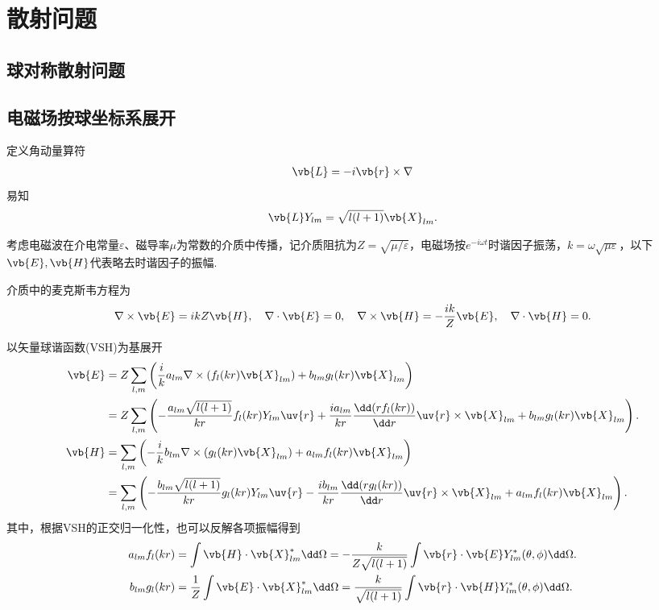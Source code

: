 \chapter{散射问题}
\section{球对称散射问题}
\section{电磁场按球坐标系展开}
\label{sec:em_field_spherical_expansion}

定义角动量算符
\begin{align*}
	\vb{L} = -i \vb{r} \times\nabla
\end{align*}
易知
\begin{align*}
	\vb{L} Y_{lm} = \sqrt{l(l+1)} \vb{X}_{lm}.
\end{align*}

考虑电磁波在介电常量\(\varepsilon\)、磁导率\(\mu\)为常数的介质中传播，记介质阻抗为\(Z = \sqrt{\mu/\varepsilon}\)，电磁场按\(e^{-i\omega t}\)时谐因子振荡，\(k = \omega\sqrt{\mu\varepsilon}\)，以下\(\vb{E},\vb{H}\)代表略去时谐因子的振幅.

介质中的麦克斯韦方程为
\begin{align*}
	\nabla \times \vb{E} = ikZ \vb{H},\quad \nabla \cdot \vb{E}=0,\quad \nabla \times \vb{H}=-\frac{ik}{Z}\vb{E},\quad \nabla \cdot \vb{H}=0.
\end{align*}

以矢量球谐函数(VSH)为基展开
\begin{equation*}
	\begin{aligned}
		\vb{E} & = Z\sum_{l,m}\left( \frac{i}{k}a_{lm}\nabla\times\left(f_l(kr)\vb{X}_{lm}\right) + b_{lm}g_l(kr)\vb{X}_{lm} \right)                                                             \\
		       & = Z\sum_{l,m}\left( -\frac{a_{lm}\sqrt{l(l+1)}}{kr}f_l(kr)Y_{lm}\uv{r} + \frac{ia_{lm}}{kr}\frac{\dd(rf_l(kr))}{\dd r}\uv{r}\times\vb{X}_{lm} + b_{lm}g_l(kr)\vb{X}_{lm} \right). \\
		\vb{H} & = \sum_{l,m}\left( -\frac{i}{k}b_{lm}\nabla\times\left(g_l(kr)\vb{X}_{lm}\right) + a_{lm}f_l(kr)\vb{X}_{lm} \right)                                                             \\
		       & = \sum_{l,m}\left( -\frac{b_{lm}\sqrt{l(l+1)}}{kr}g_l(kr)Y_{lm}\uv{r} - \frac{ib_{lm}}{kr}\frac{\dd(rg_l(kr))}{\dd r}\uv{r}\times\vb{X}_{lm} + a_{lm}f_l(kr)\vb{X}_{lm} \right).
	\end{aligned}
\end{equation*}
其中，根据VSH的正交归一化性，也可以反解各项振幅得到
\begin{align*}
	a_{lm}f_l(kr) &= \int\vb{H}\cdot\vb{X}_{lm}^*\dd \Omega = -\frac{k}{Z\sqrt{l(l+1)}}\int\vb{r}\cdot\vb{E}Y_{lm}^*(\theta,\phi)\dd \Omega.\\
	b_{lm}g_l(kr) &= \frac{1}{Z}\int\vb{E}\cdot\vb{X}_{lm}^*\dd \Omega = \frac{k}{\sqrt{l(l+1)}}\int\vb{r}\cdot\vb{H}Y_{lm}^*(\theta,\phi)\dd \Omega.
\end{align*}

